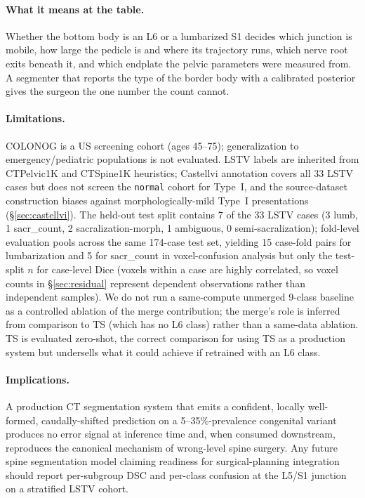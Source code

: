 \documentclass{article}
\newcommand{\sota}{TS}
\begin{document}
\paragraph{What it means at the table.}
Whether the bottom body is an L6 or a lumbarized S1
decides which junction is mobile, how large the pedicle
is and where its trajectory runs, which nerve root exits
beneath it, and which endplate the pelvic parameters were
measured from. A segmenter that reports the type of the
border body with a calibrated posterior gives the surgeon
the one number the count cannot.

\paragraph{Limitations.}
\label{sec:limits-test-set}
COLONOG is a US screening cohort (ages 45--75);
generalization to emergency/pediatric populations is not
evaluated. LSTV labels are inherited from CTPelvic1K and
CTSpine1K heuristics; Castellvi annotation covers all 33
LSTV cases but does not screen the \texttt{normal} cohort
for Type~I, and the source-dataset construction biases
against morphologically-mild Type~I presentations
(\S\ref{sec:castellvi}). The held-out test split contains
7 of the 33 LSTV cases (3 lumb, 1 sacr\_count, 2
sacralization-morph, 1 ambiguous, 0 semi-sacralization);
fold-level evaluation pools across the same 174-case test
set, yielding 15 case-fold pairs for lumbarization and 5
for sacr\_count in voxel-confusion analysis but only the
test-split $n$ for case-level Dice (voxels within a case
are highly correlated, so voxel counts in
\S\ref{sec:residual} represent dependent observations
rather than independent samples). We do not run a
same-compute unmerged 9-class baseline as a controlled
ablation of the merge contribution; the merge's role is
inferred from comparison to \sota{} (which has no L6
class) rather than a same-data ablation. \sota{} is
evaluated zero-shot, the correct comparison for using
\sota{} as a production system but undersells what it
could achieve if retrained with an L6 class.

\paragraph{Implications.}
A production CT segmentation system that emits a
confident, locally well-formed, caudally-shifted prediction
on a 5--35\%-prevalence congenital variant produces no
error signal at inference time and, when consumed
downstream, reproduces the canonical mechanism of
wrong-level spine surgery. Any future spine segmentation
model claiming readiness for surgical-planning integration
should report per-subgroup DSC and per-class confusion at
the L5/S1 junction on a stratified LSTV cohort.
\end{document}
